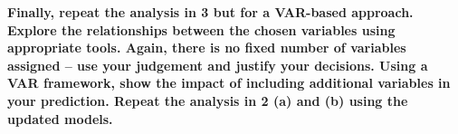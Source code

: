 \item \textbf{Finally, repeat the analysis in 3 but for a VAR-based approach. Explore the relationships between the chosen variables using appropriate tools. Again, there is no fixed number of variables assigned – use your judgement and justify your decisions.  Using a VAR framework, show the impact of including additional variables in your prediction. Repeat the analysis in 2 (a) and (b) using the updated models.} 